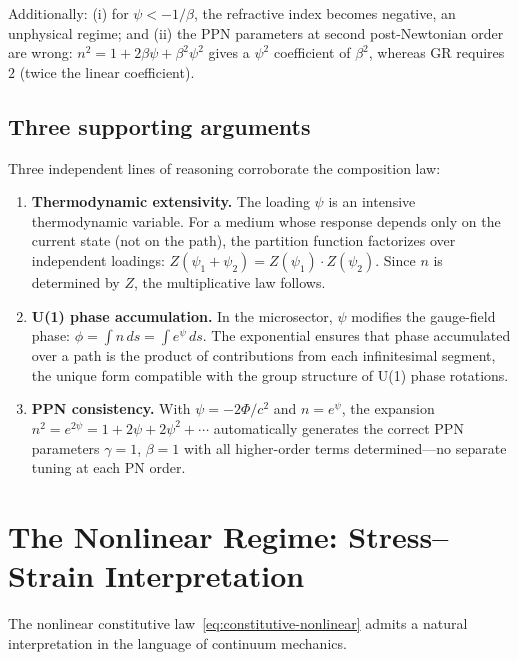 \documentclass[aps,prd,twocolumn,superscriptaddress,nofootinbib]{revtex4-2}
\begin{document}
Additionally: (i) for $\psi < -1/\beta$, the refractive index becomes
negative, an unphysical regime; and (ii) the PPN parameters at second
post-Newtonian order are wrong: $n^2 = 1 + 2\beta\psi +
\beta^2\psi^2$ gives a $\psi^2$ coefficient of $\beta^2$, whereas GR
requires $2$ (twice the linear coefficient).

\subsection{Three supporting arguments}

Three independent lines of reasoning corroborate the composition law:
\begin{enumerate}
\item \textbf{Thermodynamic extensivity.}
The loading $\psi$ is an intensive thermodynamic variable.  For a
medium whose response depends only on the current state (not on the
path), the partition function factorizes over independent loadings:
$Z(\psi_1 + \psi_2) = Z(\psi_1) \cdot Z(\psi_2)$.  Since $n$ is
determined by $Z$, the multiplicative law follows.

\item \textbf{U(1) phase accumulation.}
In the microsector, $\psi$ modifies the gauge-field phase:
$\phi = \int n\,ds = \int e^\psi\,ds$.  The exponential ensures that
phase accumulated over a path is the product of contributions from
each infinitesimal segment, the unique form compatible with the group
structure of U(1) phase rotations.

\item \textbf{PPN consistency.}
With $\psi = -2\Phi/c^2$ and $n = e^\psi$, the expansion
$n^2 = e^{2\psi} = 1 + 2\psi + 2\psi^2 + \cdots$ automatically
generates the correct PPN parameters $\gamma = 1$, $\beta = 1$ with
all higher-order terms determined---no separate tuning at each PN
order.
\end{enumerate}


\section{The Nonlinear Regime: Stress--Strain Interpretation}
\label{sec:nonlinear}

The nonlinear constitutive law~\eqref{eq:constitutive-nonlinear}
admits a natural interpretation in the language of continuum mechanics.
\end{document}
